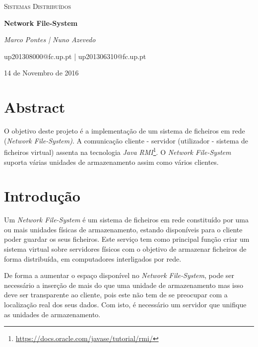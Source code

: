 \documentclass{article}
\begin{document}
\begin{titlepage}
	\centering
	\def\svgwidth{0.6\textwidth}
	\par
	\vspace{1cm}
	{\scshape\Large Sistemas Distribuídos\par}
	\vspace{3cm}
	{\Huge\bfseries Network File-System\par}
	\vspace{5cm}
	{\Large\itshape Marco Pontes | Nuno Azevedo\par}
	\vspace{0.5cm}
	{\Large up201308000@fc.up.pt | up201306310@fc.up.pt\par}
	\vfill
	{\large 14 de Novembro de 2016\par}
\end{titlepage}

\newpage
\setcounter{page}{2}

\section{Abstract}

O objetivo deste projeto é a implementação de um sistema de ficheiros em rede (\textit{Network File-System)}. A comunicação cliente - servidor (utilizador - sistema de ficheiros virtual) assenta na tecnologia \textit{Java RMI}\footnote{\url{https://docs.oracle.com/javase/tutorial/rmi/}}. O \textit{Network File-System} suporta várias unidades de armazenamento assim como vários clientes.

\section{Introdução}

Um \textit{Network File-System} é um sistema de ficheiros em rede constituído por uma ou mais unidades físicas de armazenamento, estando disponíveis para o cliente poder guardar os seus ficheiros. Este serviço tem como principal função criar um sistema virtual sobre servidores físicos com o objetivo de armazenar ficheiros de forma distribuída, em computadores interligados por rede.          

De forma a aumentar o espaço disponível no \textit{Network File-System}, pode ser necessário a inserção de mais do que uma unidade de armazenamento mas isso deve ser transparente ao cliente, pois este não tem de se preocupar com a localização real dos seus dados. Com isto, é necessário um servidor que unifique as unidades de armazenamento.
\end{document}
